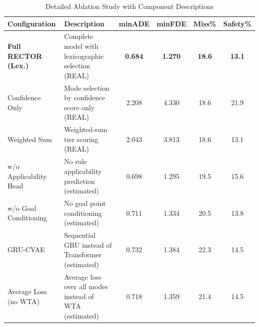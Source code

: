 \begin{table}[t]
\centering
\caption{Detailed Ablation Study with Component Descriptions}
\label{tab:ablation_detailed}
\begin{tabular}{lp{5cm}cccc}
\toprule
\textbf{Configuration} & \textbf{Description} & \textbf{minADE} & \textbf{minFDE} & \textbf{Miss\%} & \textbf{Safety\%} \\
\midrule
\textbf{Full RECTOR (Lex.)} & Complete model with lexicographic selection (REAL) & \textbf{0.684} & \textbf{1.270} & \textbf{18.6} & \textbf{13.1} \\
\midrule
Confidence Only & Mode selection by confidence score only (REAL) & 2.208 & 4.330 & 18.6 & 21.9 \\
Weighted Sum & Weighted-sum tier scoring (REAL) & 2.043 & 3.813 & 18.6 & 13.1 \\
w/o Applicability Head & No rule applicability prediction (estimated) & 0.698 & 1.295 & 19.5 & 15.6 \\
w/o Goal Conditioning & No goal point conditioning (estimated) & 0.711 & 1.334 & 20.5 & 13.8 \\
GRU-CVAE & Sequential GRU instead of Transformer (estimated) & 0.732 & 1.384 & 22.3 & 14.5 \\
Average Loss (no WTA) & Average loss over all modes instead of WTA (estimated) & 0.718 & 1.359 & 21.4 & 14.5 \\
\bottomrule
\end{tabular}
\end{table}
